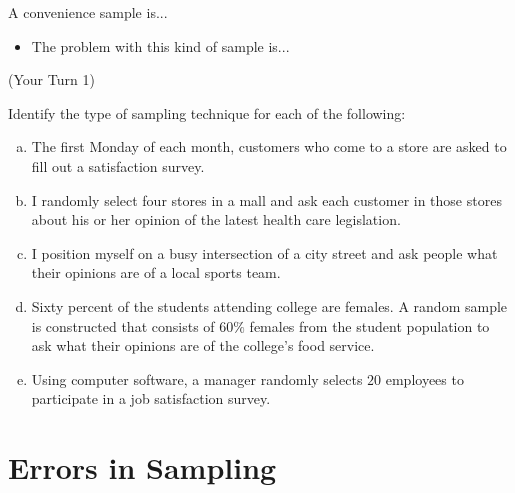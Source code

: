 \documentclass[12pt, letterpaper]{article}
\newcounter{exercise}
\theoremstyle{definition}
\begin{document}
\enlargethispage{2\baselineskip}

A convenience sample is...
\vspace*{.3in}
\begin{itemize}
\item The problem with this kind of sample is...
\vspace*{.3in}
\end{itemize}


\newpage

\begin{exercise}  (Your Turn 1)

Identify the type of sampling technique for each of the following:

\end{exercise}

\begin{enumerate}[(a)]

\item The first Monday of each month, customers who come to a store are asked to fill out a satisfaction survey.

\vfill

\item I randomly select four stores in a mall and ask each customer in those stores about his or her opinion of the latest health care legislation.

\vfill

\item I position myself on a busy intersection of a city street and ask people what their opinions are of a local sports team.

\vfill

\item Sixty percent of the students attending college are females.  A random sample is constructed that consists of $60\%$ females from the student population to ask what their opinions are of the college's food service.

\vfill

\item Using computer software, a manager randomly selects $20$ employees to participate in a job satisfaction survey.

\vfill

\end{enumerate}


\section*{Errors in Sampling}
\end{document}
